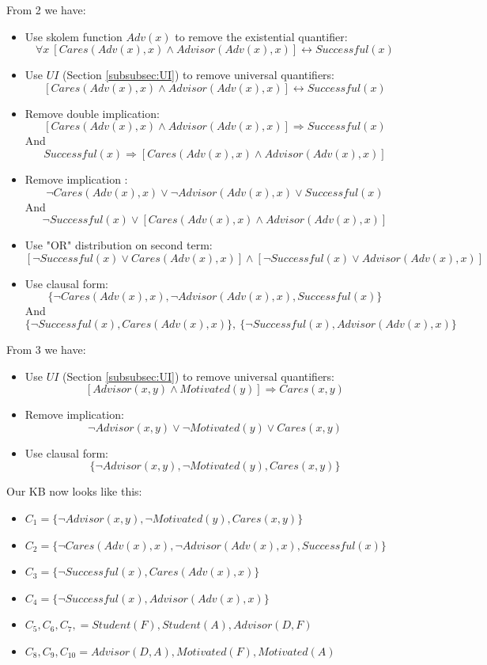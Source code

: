 \documentclass[10pt,a4paper]{article}
\begin{document}
From 2 we have:
\begin{itemize}
\item Use skolem function $Adv(x)$ to remove the existential quantifier:
\[\forall x\ [Cares(Adv(x),x)\wedge Advisor(Adv(x),x)]\leftrightarrow Successful(x)\]

\item Use $UI$ (Section \ref{subsubsec:UI}) to remove universal quantifiers:
\[ [Cares(Adv(x),x)\wedge Advisor(Adv(x),x)]\leftrightarrow Successful(x)\]
\item Remove double implication:
\[ [Cares(Adv(x),x)\wedge Advisor(Adv(x),x)]\Rightarrow Successful(x)\]
And 
\[ Successful(x)\Rightarrow [Cares(Adv(x),x)\wedge Advisor(Adv(x),x)] \]
\item Remove implication :
\[ \neg Cares(Adv(x),x)\vee \neg Advisor(Adv(x),x)\vee Successful(x)\]
And
\[ \neg Successful(x)\vee [Cares(Adv(x),x)\wedge Advisor(Adv(x),x)] \]
\item Use "OR" distribution on second term:
\[ [\neg Successful(x)\vee Cares(Adv(x),x)]\wedge [\neg Successful(x)\vee Advisor(Adv(x),x)] \]
\item Use clausal form:
\[\lbrace  \neg Cares(Adv(x),x), \neg Advisor(Adv(x),x), Successful(x)\rbrace\]
And
\[\lbrace \neg Successful(x), Cares(Adv(x),x) \rbrace,\ \lbrace \neg Successful(x), Advisor(Adv(x),x) \rbrace \]
\end{itemize}


From 3 we have:
\begin{itemize}
\item Use $UI$ (Section \ref{subsubsec:UI}) to remove universal quantifiers:
\[ [Advisor(x,y)\wedge Motivated(y)]\Rightarrow Cares(x,y)\]
\item Remove implication:
\[ \neg Advisor(x,y)\vee \neg Motivated(y)\vee Cares(x,y)\]
\item Use clausal form:
\[ \lbrace \neg Advisor(x,y), \neg Motivated(y), Cares(x,y)\rbrace\]
\end{itemize}

Our KB now looks like this:
\begin{itemize}
\item $C_1=\lbrace \neg Advisor(x,y), \neg Motivated(y), Cares(x,y)\rbrace$
\item $C_2=\lbrace  \neg Cares(Adv(x),x), \neg Advisor(Adv(x),x), Successful(x)\rbrace$
\item $C_3=\lbrace \neg Successful(x), Cares(Adv(x),x) \rbrace$
\item $C_4=\lbrace \neg Successful(x), Advisor(Adv(x),x) \rbrace$
\item $C_5,C_6,C_7,=Student(F),Student(A),Advisor(D,F)$
\item $C_8,C_9,C_{10}=Advisor(D,A), Motivated(F),Motivated(A)$
\end{itemize}
\end{document}
